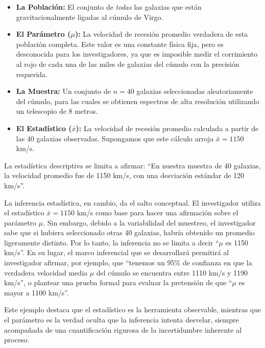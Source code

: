 \begin{itemize}
    \item \textbf{La Población:} El conjunto de \textit{todas} las galaxias que están gravitacionalmente ligadas al cúmulo de Virgo.
    \item \textbf{El Parámetro ($\mu$):} La velocidad de recesión promedio verdadera de esta población completa. Este valor es una constante física fija, pero es desconocida para los investigadores, ya que es imposible medir el corrimiento al rojo de cada una de las miles de galaxias del cúmulo con la precisión requerida.
    \item \textbf{La Muestra:} Un conjunto de $n = 40$ galaxias seleccionadas aleatoriamente del cúmulo, para las cuales se obtienen espectros de alta resolución utilizando un telescopio de 8 metros.
    \item \textbf{El Estadístico ($\bar{x}$):} La velocidad de recesión promedio calculada a partir de las 40 galaxias observadas. Supongamos que este cálculo arroja $\bar{x} = 1150$ km/s.
\end{itemize}

La estadística descriptiva se limita a afirmar: ``En nuestra muestra de 40 galaxias, la velocidad promedio fue de 1150 km/s, con una desviación estándar de 120 km/s''. 

La inferencia estadística, en cambio, da el salto conceptual. El investigador utiliza el estadístico $\bar{x} = 1150$ km/s como base para hacer una afirmación sobre el parámetro $\mu$. Sin embargo, debido a la variabilidad del muestreo, el investigador sabe que si hubiera seleccionado otras 40 galaxias, habría obtenido un promedio ligeramente distinto. Por lo tanto, la inferencia no se limita a decir ``$\mu$ es 1150 km/s''. En su lugar, el marco inferencial que se desarrollará permitirá al investigador afirmar, por ejemplo, que ``tenemos un 95\% de confianza en que la verdadera velocidad media $\mu$ del cúmulo se encuentra entre 1110 km/s y 1190 km/s'', o plantear una prueba formal para evaluar la pretensión de que ``$\mu$ es mayor a 1100 km/s''. 

Este ejemplo destaca que el estadístico es la herramienta observable, mientras que el parámetro es la verdad oculta que la inferencia intenta desvelar, siempre acompañada de una cuantificación rigurosa de la incertidumbre inherente al proceso.
